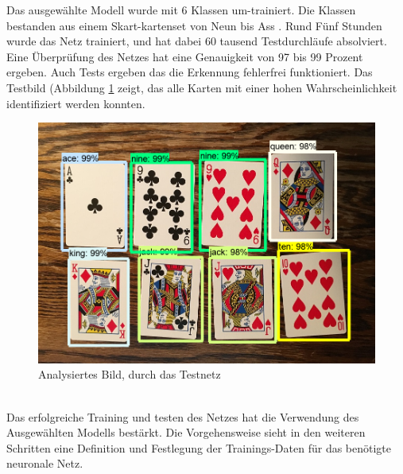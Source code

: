 \documentclass[a4paper,12pt,oneside]{article}
\begin{document}
Das ausgewählte Modell wurde mit 6 Klassen um-trainiert. Die Klassen bestanden aus einem Skart-kartenset von Neun bis Ass \cite{evan2018pic}. Rund Fünf Stunden wurde das Netz trainiert, und hat dabei 60 tausend Testdurchläufe absolviert. Eine Überprüfung des Netzes hat eine Genauigkeit von 97 bis 99 Prozent ergeben. Auch Tests ergeben das die Erkennung fehlerfrei funktioniert. Das Testbild (Abbildung \ref{img:Kartenset} zeigt, das alle Karten mit einer hohen Wahrscheinlichkeit identifiziert werden konnten.
\\
\begin{figure}
    [h]
	\centering
	\includegraphics[scale=0.5]{Sources/kartenset.png}
	\caption{Analysiertes Bild, durch das Testnetz}
	\label{img:Kartenset}
\end{figure}
\\
Das erfolgreiche Training und testen des Netzes hat die Verwendung des Ausgewählten Modells bestärkt. Die Vorgehensweise sieht in den weiteren Schritten eine Definition und Festlegung der Trainings-Daten für das benötigte neuronale Netz. 

  
\end{document}
